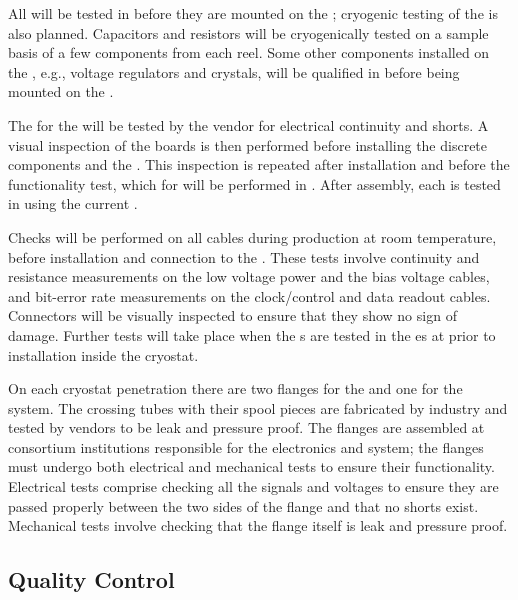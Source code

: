 All  will be tested in  before they are mounted
on the ; cryogenic testing of the  is also
planned.  Capacitors and resistors will be
cryogenically tested on a sample basis of a few components from each
reel. Some other components installed on the , e.g., 
voltage regulators and crystals, will be qualified in 
before being mounted on the .

The  for the  will be tested by the
vendor for electrical continuity and shorts. A visual inspection of
the boards is then performed before installing the discrete components
and the . This inspection is repeated after
installation and before the functionality test, which for 
will be performed in .  After assembly, each 
is tested in  using the current .

Checks will be performed on all cables during production at room
temperature, before installation and connection to the
. These tests  involve continuity and resistance
measurements on the low voltage power and the bias voltage cables, and
bit-error rate measurements on the clock/control and data readout
cables. Connectors will be visually inspected to ensure that they show
no sign of damage. Further tests will take place when the s
are tested in the \coldbox{}es at  prior to installation
inside the cryostat.

On each cryostat penetration there are two flanges for the 
and one for the  system. The crossing tubes with their spool
pieces are fabricated by industry and tested by vendors to be leak and
pressure proof. The flanges are assembled at consortium institutions
responsible for the  electronics and  system; the
flanges must undergo both electrical and mechanical tests to ensure
their functionality. Electrical tests comprise checking all the
signals and voltages to ensure they are passed properly between the
two sides of the flange and that no shorts exist. Mechanical tests
involve checking that the flange itself is leak and pressure proof.

\subsection{ Quality Control}

